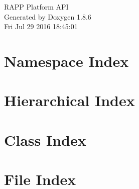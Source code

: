 \documentclass[twoside]{book}
\newcommand{\clearemptydoublepage}{%
  \newpage{\pagestyle{empty}\cleardoublepage}%
}
\begin{document}
\hypersetup{pageanchor=false}
\begin{titlepage}
\vspace*{7cm}
\begin{center}%
{\Large R\-A\-P\-P Platform A\-P\-I }\\
\vspace*{1cm}
{\large Generated by Doxygen 1.8.6}\\
\vspace*{0.5cm}
{\small Fri Jul 29 2016 18:45:01}\\
\end{center}
\end{titlepage}
\clearemptydoublepage
\tableofcontents
\clearemptydoublepage
{}
\hypersetup{pageanchor=true}

\chapter{Namespace Index}

\chapter{Hierarchical Index}

\chapter{Class Index}

\chapter{File Index}

\end{document}
